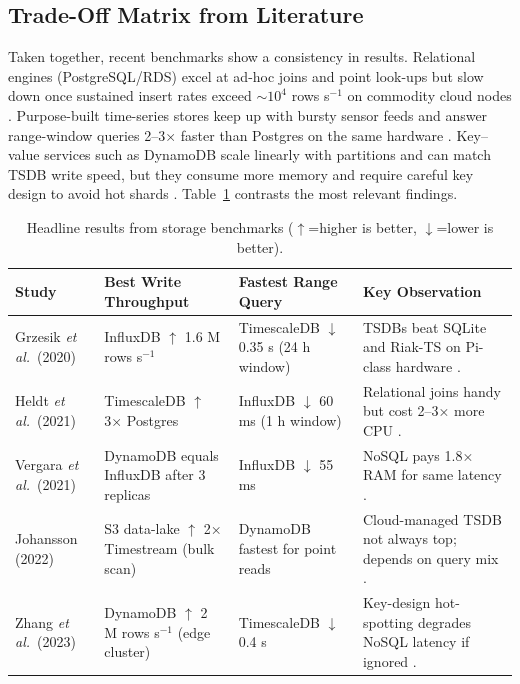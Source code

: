 \documentclass[nomenclature, english, biblatex]{kththesis}
\numberwithin{listing}{chapter}
\begin{document}
\subsection{Trade-Off Matrix from Literature}

Taken together, recent benchmarks show a consistency in results.  
Relational engines (PostgreSQL/RDS) excel at ad-hoc joins and point look-ups but slow down once sustained insert rates exceed \(\sim\!10^{4}\) rows s\(^{-1}\) on commodity cloud nodes \cite{Heldt2021SciTS}.  
Purpose-built time-series stores keep up with bursty sensor feeds and answer
range-window queries 2–3× faster than Postgres on the same hardware
\cite{Grzesik2020EdgeIoTBenchmark,Daqouri2023TimeseriesVsSQL}.  
Key–value services such as DynamoDB scale linearly with partitions and can
match TSDB write speed, but they consume more memory and require careful key
design to avoid hot shards \cite{Vergara2021PerformanceTSDB,Zhang2023EdgeTSDB}.
Table~\ref{tab:storage-matrix} contrasts the most relevant findings.

\begin{table}[H]
\centering
\caption{Headline results from storage benchmarks (\(\uparrow\)=higher is
better, \(\downarrow\)=lower is better).}
\label{tab:storage-matrix}
\begin{tabular}{p{2.8cm}p{2.1cm}p{2.1cm}p{5.5cm}}
\toprule
\textbf{Study} & \textbf{Best Write Through\-put} & \textbf{Fastest Range Query} & \textbf{Key Observation} \\
\midrule
Grzesik \textit{et al.}\ (2020) &
InfluxDB \(\uparrow\) 1.6 M rows s\(^{-1}\) &
TimescaleDB \(\downarrow\) 0.35 s (24 h window) &
TSDBs beat SQLite and Riak-TS on Pi-class hardware \cite{Grzesik2020EdgeIoTBenchmark}. \\[4pt]

Heldt \textit{et al.}\ (2021) &
TimescaleDB \(\uparrow\) 3× Postgres &
InfluxDB \(\downarrow\) 60 ms (1 h window) &
Relational joins handy but cost 2–3× more CPU \cite{Heldt2021SciTS}. \\[4pt]

Vergara \textit{et al.}\ (2021) &
DynamoDB equals InfluxDB after 3 replicas &
InfluxDB \(\downarrow\) 55 ms &
NoSQL pays 1.8× RAM for same latency \cite{Vergara2021PerformanceTSDB}. \\[4pt]

Johansson (2022) &
S3 data-lake \(\uparrow\) 2× Timestream (bulk scan) &
DynamoDB fastest for point reads &
Cloud-managed TSDB not always top; depends on query mix \cite{Johansson2022AWSCloudData}. \\[4pt]

Zhang \textit{et al.}\ (2023) &
DynamoDB \(\uparrow\) 2 M rows s\(^{-1}\) (edge cluster) &
TimescaleDB \(\downarrow\) 0.4 s &
Key-design hot-spotting degrades NoSQL latency if ignored \cite{Zhang2023EdgeTSDB}. \\
\bottomrule
\end{tabular}
\end{table}
\end{document}
